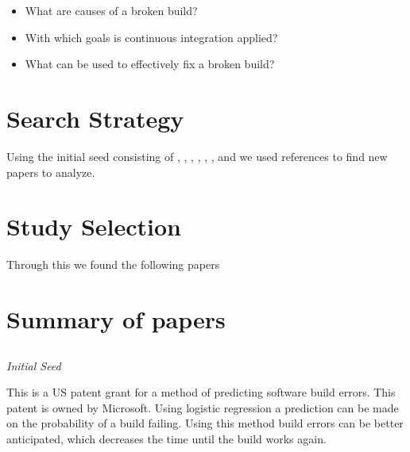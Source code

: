 \documentclass[]{book}
\providecommand{\tightlist}{%
  \setlength{\itemsep}{0pt}\setlength{\parskip}{0pt}}
\begin{document}
\begin{itemize}
\tightlist
\item
  What are causes of a broken build?
\item
  With which goals is continuous integration applied?
\item
  What can be used to effectively fix a broken build?
\end{itemize}

\section{Search Strategy}\label{search-strategy}

Using the initial seed consisting of \citet{bird2017predicting},
\citet{beller2017oops}, \citet{rausch2017empirical},
\citet{beller2017travistorrent}, \citet{pinto2018work},
\citet{zhao2017impact}, \citet{widder2018m} and \citet{hilton2016usage}
we used references to find new papers to analyze.

\section{Study Selection}\label{study-selection}

Through this we found the following papers

\section{Summary of papers}\label{summary-of-papers}

\subsection{\texorpdfstring{\citet{bird2017predicting}}{@bird2017predicting}}\label{bird2017predicting}

\emph{Initial Seed}

This is a US patent grant for a method of predicting software build
errors. This patent is owned by Microsoft. Using logistic regression a
prediction can be made on the probability of a build failing. Using this
method build errors can be better anticipated, which decreases the time
until the build works again.

\subsection{\texorpdfstring{\citet{beller2017oops}}{@beller2017oops}}\label{beller2017oops}
\end{document}
